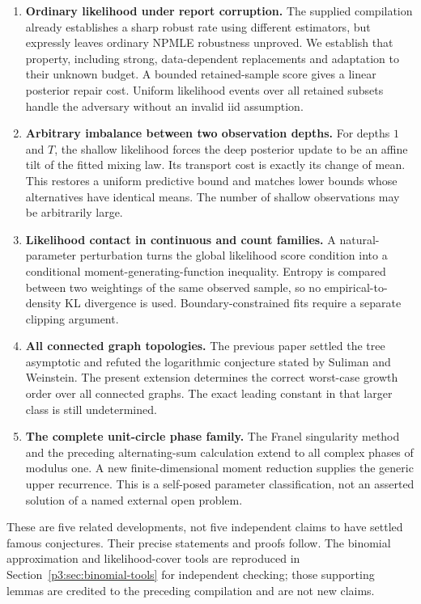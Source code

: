 \documentclass[11pt,a4paper]{article}
\theoremstyle{definition}
\theoremstyle{remark}
\numberwithin{equation}{section}
\begin{document}
\begin{enumerate}[leftmargin=*,itemsep=5pt]
\item \textbf{Ordinary likelihood under report corruption.} The supplied
compilation already establishes a sharp robust rate using different
estimators, but expressly leaves ordinary NPMLE robustness unproved.
We establish that property, including strong, data-dependent replacements
and adaptation to their unknown budget. A bounded retained-sample score
gives a linear posterior repair cost. Uniform likelihood events over all
retained subsets handle the adversary without an invalid iid assumption.

\item \textbf{Arbitrary imbalance between two observation depths.}
For depths $1$ and $T$, the shallow likelihood forces the deep posterior
update to be an affine tilt of the fitted mixing law. Its transport cost
is exactly its change of mean. This restores a uniform predictive bound
and matches lower bounds whose alternatives have identical means.
The number of shallow observations may be arbitrarily large.

\item \textbf{Likelihood contact in continuous and count families.}
A natural-parameter perturbation turns the global likelihood score
condition into a conditional moment-generating-function inequality.
Entropy is compared between two weightings of the same observed sample,
so no empirical-to-density KL divergence is used. Boundary-constrained
fits require a separate clipping argument.

\item \textbf{All connected graph topologies.} The previous paper settled
the tree asymptotic and refuted the logarithmic conjecture stated by
Suliman and Weinstein. The present extension determines the correct
worst-case growth order over all connected graphs. The exact leading
constant in that larger class is still undetermined.

\item \textbf{The complete unit-circle phase family.} The Franel
singularity method and the preceding alternating-sum calculation extend
to all complex phases of modulus one. A new finite-dimensional moment
reduction supplies the generic upper recurrence. This is a self-posed
parameter classification, not an asserted solution of a named external
open problem.
\end{enumerate}

These are five related developments, not five independent claims to have
settled famous conjectures. Their precise statements and proofs follow.
The binomial approximation and likelihood-cover tools are reproduced in
Section~\ref{p3:sec:binomial-tools} for independent checking; those supporting
lemmas are credited to the preceding compilation and are not new claims.
\end{document}
